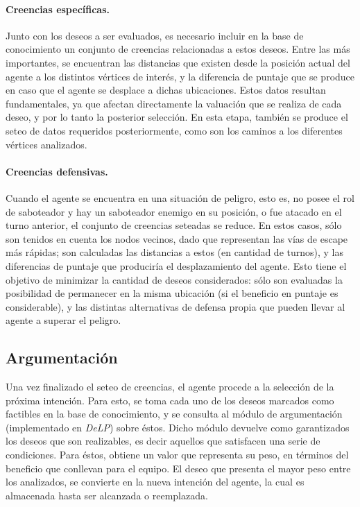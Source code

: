 \documentclass[oneside]{book}
\theoremstyle{definition}
\newcommand{\DLP}{\mbox{\textit{DeLP}}}
\begin{document}
\paragraph{Creencias específicas.} %

Junto con los deseos a ser evaluados, es necesario incluir en la base de conocimiento 
un conjunto de creencias relacionadas a estos deseos. Entre las más importantes, se 
encuentran las distancias que existen desde la posición actual del agente a los distintos 
vértices de interés, y la diferencia de puntaje que se produce en caso que el agente se desplace 
a dichas ubicaciones. Estos datos resultan fundamentales, ya que afectan directamente la 
valuación que se realiza de cada deseo, y por lo tanto la posterior selección. 
En esta etapa, también se produce el seteo de datos requeridos posteriormente, como son 
los caminos a los diferentes vértices analizados. 

\paragraph{Creencias defensivas.} %

Cuando el agente se encuentra en una situación de peligro, esto es, no posee el rol de 
saboteador y hay un saboteador enemigo en su posición, o fue atacado en el turno anterior, 
el conjunto de creencias seteadas se reduce. En estos casos, sólo son tenidos en cuenta 
los nodos vecinos, dado que representan las vías de escape más rápidas; son calculadas 
las distancias a estos (en cantidad de turnos), y las diferencias de puntaje que produciría 
el desplazamiento del agente. Esto tiene el objetivo de minimizar la cantidad de deseos 
considerados: sólo son evaluadas la posibilidad de permanecer en la misma ubicación 
(si el beneficio en puntaje es considerable), y las distintas alternativas de defensa 
propia que pueden llevar al agente a superar el peligro.

\subsection{Argumentación}

\label{sec:argumentacion}

Una vez finalizado el seteo de creencias, el agente procede a la selección de la próxima 
intención. Para esto, se toma cada uno de los deseos marcados como factibles en la base 
de conocimiento, y se consulta al módulo de argumentación \cite{Amgoud:2008}\cite{Rotstein:2007}(implementado en \DLP\cite{Ferretti:2008}) sobre éstos. 
Dicho módulo
devuelve como garantizados los deseos que son realizables, es decir aquellos que satisfacen
una serie de condiciones.
Para éstos, obtiene un valor que representa su peso, en términos del 
beneficio que conllevan para el equipo. El deseo que presenta el mayor peso entre los 
analizados, se convierte en la nueva intención del agente, la cual es almacenada hasta ser 
alcanzada o reemplazada.
\end{document}
